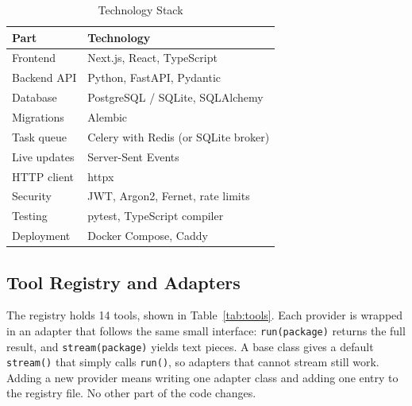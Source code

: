 \documentclass[conference]{IEEEtran}
\begin{document}
\begin{table}[htbp]
\caption{Technology Stack}
\begin{center}
\footnotesize
\begin{tabular}{@{}ll@{}}
\toprule
\textbf{Part} & \textbf{Technology} \\
\midrule
Frontend & Next.js, React, TypeScript \\
Backend API & Python, FastAPI, Pydantic \\
Database & PostgreSQL / SQLite, SQLAlchemy \\
Migrations & Alembic \\
Task queue & Celery with Redis (or SQLite broker) \\
Live updates & Server-Sent Events \\
HTTP client & httpx \\
Security & JWT, Argon2, Fernet, rate limits \\
Testing & pytest, TypeScript compiler \\
Deployment & Docker Compose, Caddy \\
\bottomrule
\end{tabular}
\label{tab:stack}
\end{center}
\end{table}

\subsection{Tool Registry and Adapters}
The registry holds 14 tools, shown in Table~\ref{tab:tools}. Each provider is wrapped in an adapter that
follows the same small interface: \texttt{run(package)} returns the full result, and \texttt{stream(package)}
yields text pieces. A base class gives a default \texttt{stream()} that simply calls \texttt{run()}, so
adapters that cannot stream still work. Adding a new provider means writing one adapter class and adding
one entry to the registry file. No other part of the code changes.
\end{document}
